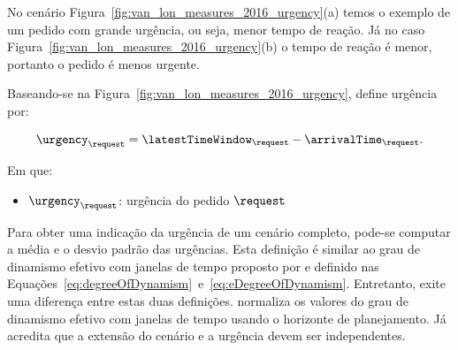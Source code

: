 No cenário Figura~\ref{fig:van_lon_measures_2016_urgency}(a) temos o exemplo de
um pedido com grande urgência, ou seja, menor tempo de reação.
Já no caso Figura~\ref{fig:van_lon_measures_2016_urgency}(b) o tempo de reação
é menor, portanto o pedido é menos urgente.

Baseando-se na Figura~\ref{fig:van_lon_measures_2016_urgency}, 
 define urgência por:

\begin{equation}
    \urgency_\request = \latestTimeWindow_\request - \arrivalTime_\request.
    \label{eq:van_lon_measures_2016_urgency}
\end{equation}

Em que:
\begin{itemize}
  \item $\urgency_\request$: urgência do pedido $\request$
\end{itemize}

Para obter uma indicação da urgência de um cenário completo, pode-se computar a
média e o desvio padrão das urgências. 
Esta definição é similar ao grau de dinamismo efetivo com janelas de tempo 
proposto por  e definido nas
Equações~\ref{eq:degreeOfDynamism}~e~\ref{eq:eDegreeOfDynamism}.
Entretanto, exite uma diferença entre estas duas definições.
 normaliza os valores do grau de dinamismo
efetivo com janelas de tempo usando o horizonte de planejamento.  
Já  acredita que a extensão do cenário e
a urgência devem ser independentes.



